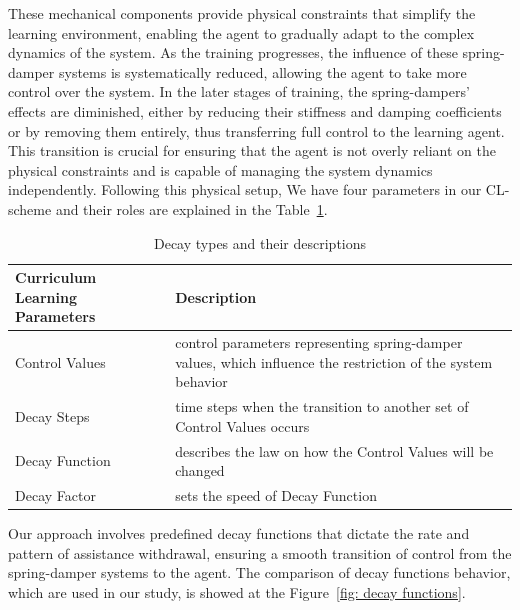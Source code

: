 These mechanical components provide physical constraints that simplify the learning environment, enabling the agent to gradually adapt to the complex dynamics of the system. As the training progresses, the influence of these spring-damper systems is systematically reduced, allowing the agent to take more control over the system. In the later stages of training, the spring-dampers' effects are diminished, either by reducing their stiffness and damping coefficients or by removing them entirely, thus transferring full control to the learning agent. This transition is crucial for ensuring that the agent is not overly reliant on the physical constraints and is capable of managing the system dynamics independently.
Following this physical setup, We have four parameters in our CL-scheme and their roles are explained in the Table~\ref{table: decay types}. 

\begin{table}[h]
	\caption{Decay types and their descriptions}
	\centering
	\begin{tabular}{m{2.4cm}|m{5cm}}
		\toprule
		\textbf{Curriculum Learning Parameters} & \textbf{Description} \\ \midrule
		Control Values & control parameters representing spring-damper values, which influence the restriction of the system behavior\\ \hline 
		Decay Steps & time steps when the transition to another set of Control Values occurs\\ \hline 
		Decay Function & describes the law on how the Control Values will be changed\\ \hline
		Decay Factor & sets the speed of Decay Function\\ 
		\bottomrule
	\end{tabular}
	\label{table: decay types}
\end{table}

Our approach involves predefined decay functions that dictate the rate and pattern of assistance withdrawal, ensuring a smooth transition of control from the spring-damper systems to the agent. The comparison of decay functions behavior, which are used in our study, is showed at the Figure~\ref{fig: decay functions}.

